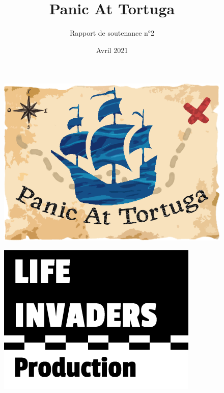 \documentclass[french, 15pt]{article}
\title{\fontfamily{phv}\selectfont \Huge \textbf{Panic At Tortuga}}
\author{\fontfamily{phv}\Huge{Rapport de soutenance n°2}}
\date{\fontfamily{phv}\selectfont Avril 2021}
\begin{document}
\begin{titlepage}
    \maketitle
    
    \thispagestyle{empty}
    \vspace{10pt}
    \begin{figure}[hbt!]
        \centering
        \includegraphics[scale=0.43]{logo.png}
    \end{figure}
    \vspace{10pt}

    \begin{figure}[hbt!]
        \centering
        \includegraphics[scale=0.84]{logo_lifeinvaders_copie.png}
    \end{figure}
\end{titlepage}
\end{document}

